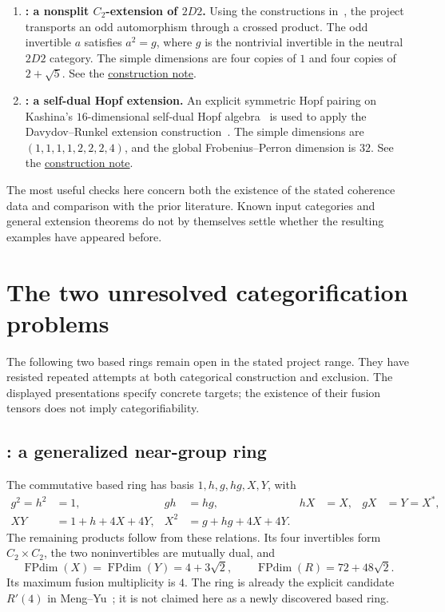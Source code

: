 \documentclass[11pt,a4paper]{article}
\newcommand{\FPdim}{\operatorname{FPdim}}
\newcommand{\caseid}[1]{\texttt{\detokenize{#1}}}
\newcommand{\snap}{https://github.com/sebastienpalcoux/grothendieck-ring-classification/blob/e34396cd95aff1090c10974dd934fe6054ca45eb}
\newcommand{\prooflink}[2]{\href{\snap/#1}{#2}}
\begin{document}
\begin{enumerate}[label=\arabic*.,itemsep=5pt]
\item \textbf{\caseid{R8_2_37}: a nonsplit $C_2$-extension of $2D2$.}
Using the constructions in~\cite{Grossman,GIS}, the project transports an
odd automorphism through a crossed product. The odd invertible $a$
satisfies $a^2=g$, where $g$ is the nontrivial invertible in the neutral
$2D2$ category. The simple dimensions are four copies of $1$ and four
copies of $2+\sqrt5$. See the
\prooflink{evidence/unified_20261016/rank8/R37_CONSTRUCTION.md}{construction note}.

\item \textbf{\caseid{R8_2_575}: a self-dual Hopf extension.}
An explicit symmetric Hopf pairing on Kashina's $16$-dimensional
self-dual Hopf algebra~\cite{Kashina} is used to apply the
Davydov--Runkel extension construction~\cite{DR}.
The simple dimensions are $(1,1,1,1,2,2,2,4)$, and the global
Frobenius--Perron dimension is $32$. See the
\prooflink{evidence/upper_residual_20261002b/r8_integral/r575/PROOF.md}{construction note}.
\end{enumerate}

The most useful checks here concern both the existence of the stated
coherence data and comparison with the prior literature. Known input
categories and general extension theorems do not by themselves settle
whether the resulting examples have appeared before.

\section{The two unresolved categorification problems}
The following two based rings remain open in the stated project range.
They have resisted repeated attempts at both categorical construction
and exclusion. The displayed presentations specify concrete targets;
the existence of their fusion tensors does not imply categorifiability.

\subsection*{\caseid{R6_4_155}: a generalized near-group ring}
The commutative based ring has basis $1,h,g,hg,X,Y$, with
\begin{align*}
 g^2=h^2&=1, & gh&=hg, & hX&=X, & gX&=Y=X^*,\\
 XY&=1+h+4X+4Y, & X^2&=g+hg+4X+4Y.
\end{align*}
The remaining products follow from these relations. Its four invertibles
form $C_2\times C_2$, the two noninvertibles are mutually dual, and
\[
 \FPdim(X)=\FPdim(Y)=4+3\sqrt2,
 \qquad \FPdim(R)=72+48\sqrt2.
\]
Its maximum fusion multiplicity is $4$. The ring is already the explicit
candidate $R'(4)$ in Meng--Yu~\cite[Theorem 1.1]{MY}; it is not claimed
here as a newly discovered based ring.
\end{document}
